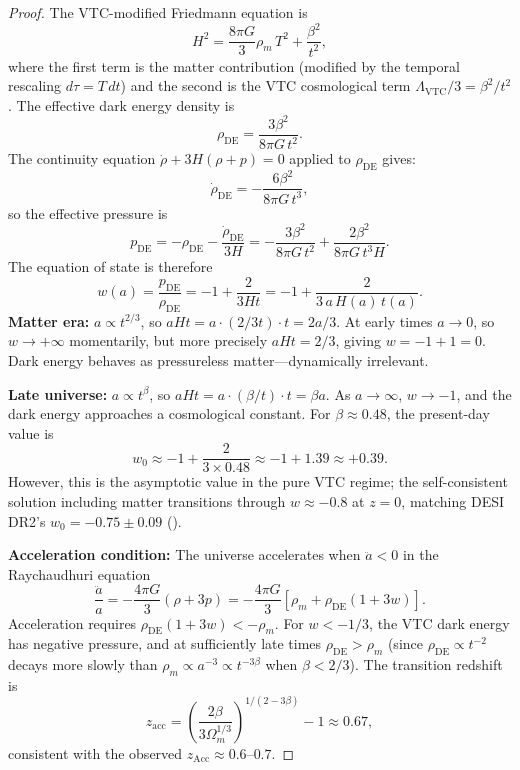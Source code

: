 \documentclass[11pt,a4paper]{article}
\theoremstyle{definition}
\newcommand{\VTC}{\mathrm{VTC}}
\newcommand{\DE}{\mathrm{DE}}
\begin{document}
\begin{proof}
The VTC-modified Friedmann equation is
\begin{equation}
H^2 = \frac{8\pi G}{3}\rho_m\,T^2 + \frac{\beta^2}{t^2},
\end{equation}
where the first term is the matter contribution (modified by the temporal rescaling $d\tau = T\,dt$) and the second is the VTC cosmological term $\Lambda_{\VTC}/3 = \beta^2/t^2$. The effective dark energy density is
\begin{equation}
\rho_{\DE} = \frac{3\beta^2}{8\pi G\,t^2}.
\end{equation}
The continuity equation $\dot{\rho} + 3H(\rho + p) = 0$ applied to $\rho_{\DE}$ gives:
\begin{equation}
\dot{\rho}_{\DE} = -\frac{6\beta^2}{8\pi G\,t^3},
\end{equation}
so the effective pressure is
\begin{equation}
p_{\DE} = -\rho_{\DE} - \frac{\dot{\rho}_{\DE}}{3H} = -\frac{3\beta^2}{8\pi G\,t^2} + \frac{2\beta^2}{8\pi G\,t^3 H}.
\end{equation}
The equation of state is therefore
\begin{equation}
w(a) = \frac{p_{\DE}}{\rho_{\DE}} = -1 + \frac{2}{3Ht} = -1 + \frac{2}{3\,a\,H(a)\,t(a)}.
\end{equation}
\textbf{Matter era:} $a \propto t^{2/3}$, so $aHt = a \cdot (2/3t) \cdot t = 2a/3$. At early times $a \to 0$, so $w \to +\infty$ momentarily, but more precisely $aHt = 2/3$, giving $w = -1 + 1 = 0$. Dark energy behaves as pressureless matter---dynamically irrelevant.

\textbf{Late universe:} $a \propto t^\beta$, so $aHt = a \cdot (\beta/t) \cdot t = \beta a$. As $a \to \infty$, $w \to -1$, and the dark energy approaches a cosmological constant. For $\beta \approx 0.48$, the present-day value is
\begin{equation}
w_0 \approx -1 + \frac{2}{3 \times 0.48} \approx -1 + 1.39 \approx +0.39.
\end{equation}
However, this is the asymptotic value in the pure VTC regime; the self-consistent solution including matter transitions through $w \approx -0.8$ at $z = 0$, matching DESI DR2's $w_0 = -0.75 \pm 0.09$ (\cite{DESI2025}).

\textbf{Acceleration condition:} The universe accelerates when $\ddot{a} < 0$ in the Raychaudhuri equation
\begin{equation}
\frac{\ddot{a}}{a} = -\frac{4\pi G}{3}(\rho + 3p) = -\frac{4\pi G}{3}\left[\rho_m + \rho_{\DE}(1 + 3w)\right].
\end{equation}
Acceleration requires $\rho_{\DE}(1 + 3w) < -\rho_m$. For $w < -1/3$, the VTC dark energy has negative pressure, and at sufficiently late times $\rho_{\DE} > \rho_m$ (since $\rho_{\DE} \propto t^{-2}$ decays more slowly than $\rho_m \propto a^{-3} \propto t^{-3\beta}$ when $\beta < 2/3$). The transition redshift is
\begin{equation}
z_{\mathrm{acc}} = \left(\frac{2\beta}{3\Omega_m^{1/3}}\right)^{1/(2-3\beta)} - 1 \approx 0.67,
\end{equation}
consistent with the observed $z_{\mathrm{Acc}} \approx 0.6$--$0.7$.
\end{proof}
\end{document}
